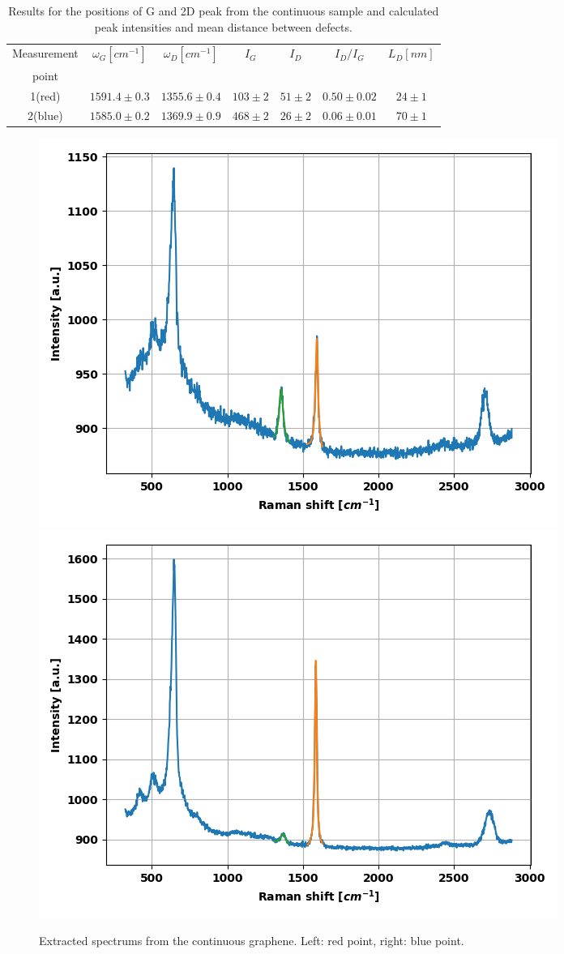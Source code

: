 \documentclass[12pt,a4paper]{article}
\begin{document}
\begin{table}[h]
\centering
\begin{tabular}{|c|c|c|c|c|c|c|}
\hline 
Measurement &  $\omega_G[cm^{-1}]$  & $\omega_D[cm^{-1}]$& $I_G$ & $I_D$ & $I_D/I_G $ & $L_D[nm]$\\ 
point &  &  & & & &\\ 
\hline
1(red) & $1591.4 \pm 0.3$ & $1355.6 \pm 0.4$ & $103 \pm 2$ & $51 \pm 2$ & $0.50 \pm 0.02$ & $24\pm 1$\\ 
\hline
2(blue) & $1585.0 \pm 0.2$ & $1369.9 \pm 0.9$ & $468 \pm 2$ & $26 \pm 2$ & $0.06 \pm 0.01$ & $70\pm 1$\\ 
\hline
\end{tabular} 
\caption{Results for the positions of G and 2D peak from the continuous sample and calculated peak intensities and mean distance between defects.}
\label{tab:part7_results}
\end{table}


\begin{figure}[!htb]
\centering
\includegraphics[scale=0.5]{Bilder/part7/1.png}
\includegraphics[scale=0.5]{Bilder/part7/2.png}
\caption{Extracted spectrums from the continuous graphene. Left: red point, right: blue point.}
\label{fig:part7_spectrum}
\end{figure}
\end{document}
